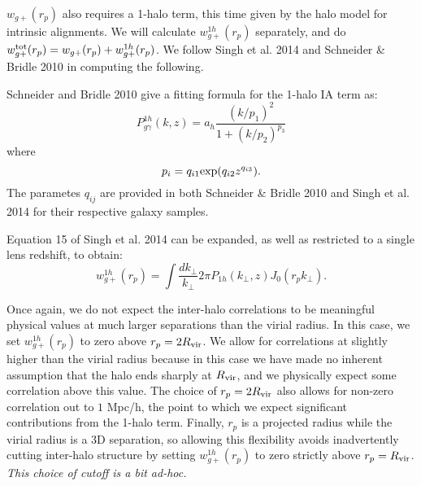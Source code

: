 \documentclass[onecolumn,amsmath,aps,fleqn, superscriptaddress]{revtex4}
\begin{document}
$w_{g+}(r_p)$ also requires a 1-halo term, this time given by the halo model for intrinsic alignments. We will calculate $w_{g+}^{1h}(r_p)$ separately, and do $w_{g+}^{\rm tot}(r_p) = w_{g+}(r_p) + w_{g+}^{1h}(r_p)$. We follow Singh et al. 2014 and Schneider \& Bridle 2010 in computing the following.

Schneider and Bridle 2010 give a fitting formula for the 1-halo IA term as:
\begin{equation}
P^{1h}_{g\gamma}(k,z) = a_h \frac{(k/p_1)^2}{1+ (k/p_2)^{p_3}}
\label{P1hIA}
\end{equation}
where
\begin{equation}
p_i = q_{i1} {\rm exp}(q_{i2} z^{q_{i3}}).
\label{pi}
\end{equation}
The parametes $q_{ij}$ are provided in both Schneider \& Bridle 2010 and Singh et al. 2014 for their respective galaxy samples. 

Equation 15 of Singh et al. 2014 can be expanded, as well as restricted to a single lens redshift, to obtain:
\begin{equation}
w_{g+}^{1h}(r_p) = \int \frac{dk_\perp}{k_\perp}{2\pi} P_{1h}(k_\perp,z) J_0(r_p k_\perp).
\label{wg1h}
\end{equation}

Once again, we do not expect the inter-halo correlations to be meaningful physical values at much larger separations than the virial radius. In this case, we set $w_{g+}^{1h}(r_p)$ to zero above $r_p = 2 R_{\rm vir}$. We allow for correlations at slightly higher than the virial radius because in this case we have made no inherent assumption that the halo ends sharply at $R_{\rm vir}$, and we physically expect some correlation above this value. The choice of $r_p = 2 R_{\rm vir}$ also allows for non-zero correlation out to $1$ Mpc/h, the point to which we expect significant contributions from the 1-halo term. Finally, $r_p$ is a projected radius while the virial radius is a 3D separation, so allowing this flexibility avoids inadvertently cutting inter-halo structure by setting $w_{g+}^{1h}(r_p)$ to zero strictly above $r_p = R_{\rm vir}$. {\it This choice of cutoff is a bit ad-hoc.}
\end{document}
